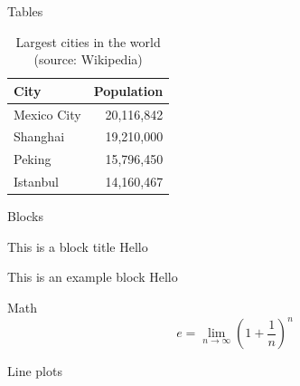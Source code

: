 \documentclass[aspectratio=169]{beamer}
\begin{document}
\begin{frame}{Tables}
  \begin{table}
    \caption{Largest cities in the world (source: Wikipedia)}
    \begin{tabular}{lr}
      \toprule
      City & Population\\
      \midrule
      Mexico City & 20,116,842\\
      Shanghai & 19,210,000\\
      Peking & 15,796,450\\
      Istanbul & 14,160,467\\
      \bottomrule
    \end{tabular}
  \end{table}
\end{frame}
\begin{frame}{Blocks}

  \begin{block}{This is a block title}
    Hello
  \end{block}

  \begin{exampleblock}{This is an example block}
    Hello
  \end{exampleblock}



\end{frame}
\begin{frame}{Math}
  \begin{equation*}
    e = \lim_{n\to \infty} {\left(1 + \frac{1}{n}\right)}^n
  \end{equation*}
\end{frame}

\begin{frame}{Line plots}
\begin{center}
\end{center}


\end{frame}
\end{document}
